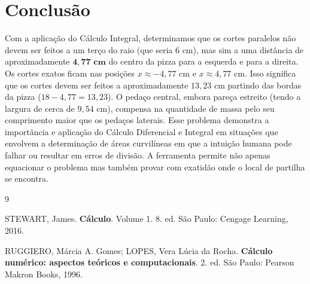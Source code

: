 \documentclass[12pt,a4paper]{article}
\begin{document}
\section{Conclus\~ao}
Com a aplica\c{c}\~ao do C\'alculo Integral, determinamos que os cortes paralelos n\~ao devem ser feitos a um ter\c{c}o do raio (que seria $6\text{ cm}$), mas sim a uma dist\^ancia de aproximadamente $\mathbf{4,77\text{ cm}}$ do centro da pizza para a esquerda e para a direita. Os cortes exatos ficam nas posi\c{c}\~oes $x \approx -4,77\text{ cm}$ e $x \approx 4,77\text{ cm}$. Isso significa que os cortes devem ser feitos a aproximadamente $13,23\text{ cm}$ partindo das bordas da pizza ($18 - 4,77 = 13,23$). O peda\c{c}o central, embora pare\c{c}a estreito (tendo a largura de cerca de $9,54\text{ cm}$), compensa na quantidade de massa pelo seu comprimento maior que os peda\c{c}os laterais. Esse problema demonstra a import\^ancia e aplicação do C\'alculo Diferencial e Integral em situa\c{c}\~oes que envolvem a determina\c{c}\~ao de \'areas curvil\'ineas em que a intui\c{c}\~ao humana pode falhar ou resultar em erros de divis\~ao. A ferramenta permite n\~ao apenas equacionar o problema mas tamb\'em provar com exatidão onde o local de partilha se encontra.

\clearpage

\renewcommand{\refname}{Refer\^encias}
\begin{thebibliography}{9}

 STEWART, James. \textbf{C\'alculo}. Volume 1. 8. ed. S\~ao Paulo: Cengage Learning, 2016.

 RUGGIERO, M\'arcia A. Gomes; LOPES, Vera L\'ucia da Rocha. \textbf{C\'alculo num\'erico: aspectos te\'oricos e computacionais}. 2. ed. S\~ao Paulo: Pearson Makron Books, 1996.

\end{thebibliography}

\clearpage
\end{document}
